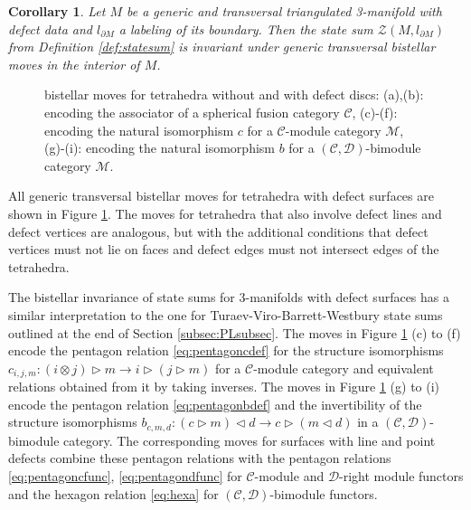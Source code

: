 \documentclass[1.5pt, a4paper]{article}
\newcommand{\mac}{\mathcal C}
\newcommand{\mad}{\mathcal D}
\newcommand{\mam}{\mathcal M}
\newcommand{\oo}[0]{\otimes}
\newtheorem{corollary}[theorem]{Corollary}
\begin{document}
\begin{corollary}\label{cor:pachner} Let $M$ be a generic and transversal  triangulated 3-manifold with defect data and $l_{\partial M}$ a labeling of its boundary. 
Then the state sum $\mathcal Z(M, l_{\partial M})$ from Definition \ref{def:statesum} is invariant under  generic transversal bistellar moves in the interior of $M$.
\end{corollary}

\begin{figure}
\def\svgwidth{.9\columnwidth}

\caption{bistellar moves for tetrahedra without and with defect discs:\protect\newline
(a),(b):  encoding the associator of a spherical fusion category $\mac$,\protect\newline
(c)-(f):   encoding the natural isomorphism $c$ for a $\mac$-module category $\mam$,\protect\newline
(g)-(i):  encoding the natural isomorphism $b$ for a $(\mac,\mad)$-bimodule category $\mam$.
}
\label{fig:pachnerdef}
\end{figure}

All  generic transversal bistellar moves  for tetrahedra with defect surfaces are shown in Figure \ref{fig:pachnerdef}.  The moves for tetrahedra that also involve defect lines and defect vertices are analogous, but with the additional conditions that  defect vertices must not lie on faces  and defect edges must not intersect edges of the tetrahedra. 





The bistellar invariance of state sums for 3-manifolds with defect surfaces has a similar interpretation to the one for Turaev-Viro-Barrett-Westbury state sums outlined at the end of Section \ref{subsec:PLsubsec}. The moves  in Figure \ref{fig:pachnerdef} (c) to (f) encode the pentagon relation \eqref{eq:pentagoncdef} for the structure  isomorphisms $c_{i,j,m}: (i\oo j)\rhd m\to i\rhd (j\rhd m)$ for a $\mac$-module category and equivalent relations obtained from it by taking inverses. The  moves in Figure \ref{fig:pachnerdef} (g) to (i) encode the pentagon relation \eqref{eq:pentagonbdef} and the invertibility of the structure isomorphisms $b_{c,m,d}: (c\rhd m)\lhd d\to c\rhd (m\lhd d)$ in a $(\mac,\mad)$-bimodule category.  
The corresponding moves for surfaces with line and point defects combine these pentagon relations with the pentagon relations \eqref{eq:pentagoncfunc}, \eqref{eq:pentagondfunc} for $\mac$-module and $\mad$-right module functors and the hexagon relation \eqref{eq:hexa} for $(\mac,\mad)$-bimodule functors.
\end{document}
